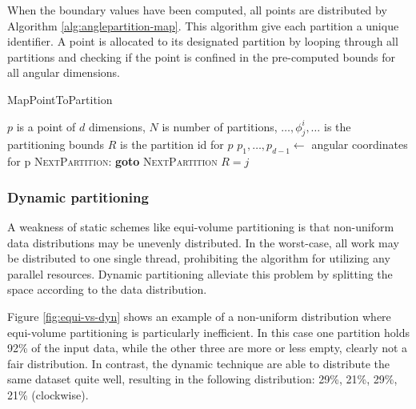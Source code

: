 \documentclass[12pt,a4paper,twoside]{report}
\begin{document}
When the boundary values have been computed, all points are
distributed by Algorithm \ref{alg:anglepartition-map}. This
algorithm give each partition a unique identifier. A point is
allocated to its designated partition by looping through all
partitions and checking if the point is confined in the
pre-computed bounds for all angular dimensions.

\begin{algorithm}[H]
	\caption{MapPointToPartition}
	\label{alg:anglepartition-map}
	\begin{algorithmic}
		\Require 
			$p$ is a point of $d$ dimensions, 
			$N$ is number of partitions,
			$\ldots, \phi_j^i, \ldots$ is the partitioning bounds 
		\Ensure $R$ is the partition id for $p$
		\State $p_1, \ldots, p_{d-1} \leftarrow$ angular coordinates for p
			\State \textsc{NextPartition:}
					\State \textbf{goto} \textsc{NextPartition}
				\EndIf
			\EndFor
			\State $R = j$
		\EndFor
	\end{algorithmic}
\end{algorithm}

\subsubsection{Dynamic partitioning}

A weakness of static schemes like equi-volume partitioning is that
non-uniform data distributions may be unevenly distributed. In the
worst-case, all work may be distributed to one single thread,
prohibiting the algorithm for utilizing any parallel resources.
Dynamic partitioning alleviate this problem by splitting the space
according to the data distribution. 

Figure \ref{fig:equi-vs-dyn} shows an example of a non-uniform
distribution where equi-volume partitioning is particularly
inefficient. In this case one partition holds 92\% of the input
data, while the other three are more or less empty, clearly not a
fair distribution. In contrast, the dynamic technique are able to
distribute the same dataset quite well, resulting in the
following distribution: 29\%, 21\%, 29\%, 21\% (clockwise).
\end{document}
